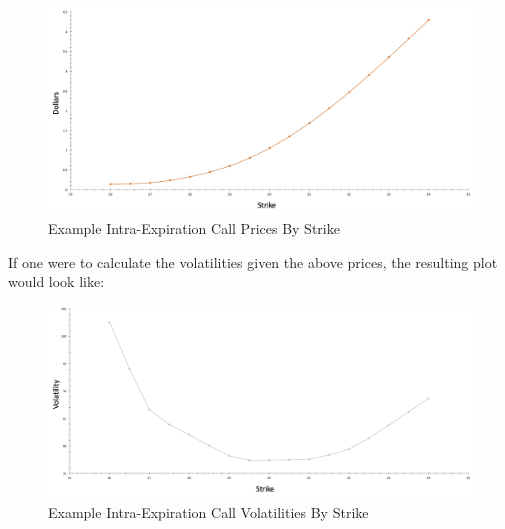 \documentclass[12pt, a4paper, notitlepage]{article}
\numberwithin{equation}{subsection}
\numberwithin{figure}{subsection}
\numberwithin{table}{subsection}
\begin{document}
\begin{figure}[H]
	\caption{Example Intra-Expiration Call Prices By Strike}
	\centerline{\includegraphics[width=1\textwidth]{Example_Call_Price_Plot}}
\end{figure}

If one were to calculate the volatilities given the above prices, the resulting plot would look like:

\begin{figure}[H]
	\caption{Example Intra-Expiration Call Volatilities By Strike}
	\centerline{\includegraphics[width=1\textwidth]{Example_Call_Vol_Plot}}\label{fig:ExCallVolsByStrike}
\end{figure}
\end{document}
